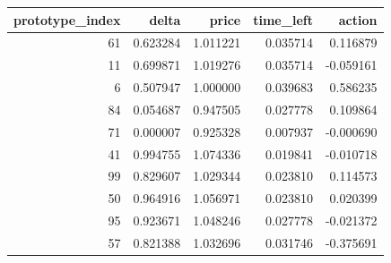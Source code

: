 \begin{tabular}{rrrrr}
\toprule
prototype_index & delta & price & time_left & action \\
\midrule
61 & 0.623284 & 1.011221 & 0.035714 & 0.116879 \\
11 & 0.699871 & 1.019276 & 0.035714 & -0.059161 \\
6 & 0.507947 & 1.000000 & 0.039683 & 0.586235 \\
84 & 0.054687 & 0.947505 & 0.027778 & 0.109864 \\
71 & 0.000007 & 0.925328 & 0.007937 & -0.000690 \\
41 & 0.994755 & 1.074336 & 0.019841 & -0.010718 \\
99 & 0.829607 & 1.029344 & 0.023810 & 0.114573 \\
50 & 0.964916 & 1.056971 & 0.023810 & 0.020399 \\
95 & 0.923671 & 1.048246 & 0.027778 & -0.021372 \\
57 & 0.821388 & 1.032696 & 0.031746 & -0.375691 \\
\bottomrule
\end{tabular}
